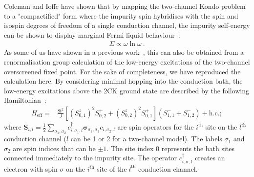 \documentclass[reprint,hidelinks,onecolumn]{revtex4-2}
\begin{document}
Coleman and Ioffe have shown that by mapping the two-channel Kondo problem to a "compactified" form where the impurity spin hybridises with the spin and isospin degrees of freedom of a single conduction channel, the impurity self-energy can be shown to display marginal Fermi liquid behaviour~\cite{Coleman_tsvelik,Schofield1997}:
\begin{equation}\begin{aligned}
	\Sigma \propto \omega \ln \omega~.
\end{aligned}\end{equation}
As some of us have shown in a previous work~\cite{Patra2023MCK}, this can also be obtained from a renormalisation group calculation of the low-energy excitations of the two-channel overscreened fixed point. For the sake of completeness, we have reproduced the calculation here. By considering minimal hopping into the conduction bath, the low-energy excitations above the 2CK ground state are described by the following Hamiltonian~\cite{Patra2023MCK}:
\begin{eqnarray}
	\label{nfl_terms}
	H_\mathrm{eff} =& \frac{8t^2}{{J}}\left[\left(S^z_{0,1}\right)^2 S^+_{0,2} + \left(S^z_{0,2}\right)^2 S^+_{0,1}\right] \left(S^-_{1,1} + S^-_{1,2}\right) + \mathrm{h.c.};
\end{eqnarray}
where \({\boldsymbol S}_{i,l} = \frac{1}{2}\sum_{\sigma_1,\sigma_2}c^\dagger_{i,\sigma_1,l}{\boldsymbol \sigma}_{\sigma_1,\sigma_2}c_{i,\sigma_2,l}\) are spin operators for the \(i^\text{th}\) site on the \(l^\text{th}\) conduction channel (\(l\) can be 1 or 2 for a two-channel model). The labels \(\sigma_1\) and \(\sigma_2\) are spin indices that can be \(\pm 1\). The site index \(0\) represents the bath sites connected immediately to the impurity site. The operator \(c^\dagger_{i,\sigma,l}\) creates an electron with spin \(\sigma\) on the \(i^\text{th}\) site of the \(l^\text{th}\) conduction channel.
\end{document}
